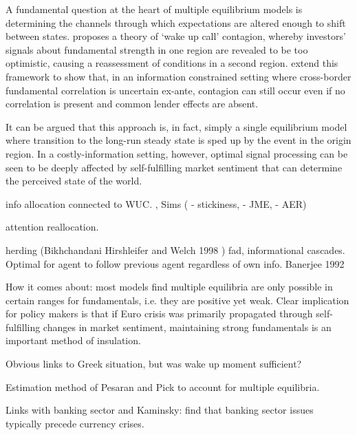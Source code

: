 \documentclass[../base.tex]{subfiles}
\begin{document}


A fundamental question at the heart of multiple equilibrium models is determining the channels through which expectations are altered enough to shift between states. \cite{goldstein1998asian} proposes a theory of `wake up call' contagion, whereby investors' signals about fundamental strength in one region are revealed to be too optimistic, causing a reassessment of conditions in a second region. \cite{ahnert2015wake} extend this framework to show that, in an information constrained setting where cross-border fundamental correlation is uncertain ex-ante, contagion can still occur even if no correlation is present and common lender effects are absent. 

It can be argued that this approach is, in fact, simply a single equilibrium model where transition to the long-run steady state is sped up by the event in the origin region. In a costly-information setting, however, optimal signal processing can be seen to be deeply affected by self-fulfilling market sentiment that can determine the perceived state of the world.



info allocation connected to WUC. \cite{coibion2010information}, Sims (\cite{sims1998stickiness} - stickiness, \cite{sims2003implications} - JME, \cite{sims2006rational} - AER)


\cite{mondria2013financial} attention reallocation. 

herding (Bikhchandani Hirshleifer and Welch 1998 \cite{bikhchandani1992theory}) fad, informational cascades. Optimal for agent to follow previous agent regardless of own info. Banerjee 1992

How it comes about: most models find multiple equilibria are only possible in certain ranges for fundamentals, i.e. they are positive yet weak. Clear implication for policy makers is that if Euro crisis was primarily propagated through self-fulfilling changes in market sentiment, maintaining strong fundamentals is an important method of insulation. 


Obvious links to Greek situation, but was wake up moment sufficient?

Estimation method of Pesaran and Pick to account for multiple equilibria.

Links with banking sector \cite{alter2012credit} and \cite{kaminsky1999twin}
Kaminsky: find that banking sector issues typically precede currency crises.
\end{document}
